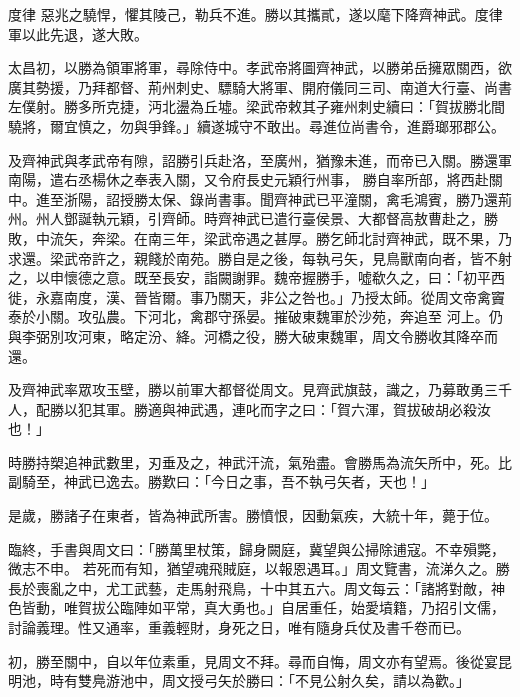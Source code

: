 \begin{pinyinscope}
 度律
 惡兆之驍悍，懼其陵己，勒兵不進。勝以其攜貳，遂以麾下降齊神武。度律軍以此先退，遂大敗。



 太昌初，以勝為領軍將軍，尋除侍中。孝武帝將圖齊神武，以勝弟岳擁眾關西，欲廣其勢援，乃拜都督、荊州刺史、驃騎大將軍、開府儀同三司、南道大行臺、尚書左僕射。勝多所克捷，沔北盪為丘墟。梁武帝敕其子雍州刺史續曰：「賀拔勝北間驍將，爾宜慎之，勿與爭鋒。」續遂城守不敢出。尋進位尚書令，進爵瑯邪郡公。



 及齊神武與孝武帝有隙，詔勝引兵赴洛，至廣州，猶豫未進，而帝已入關。勝還軍南陽，遣右丞楊休之奉表入關，又令府長史元穎行州事，
 勝自率所部，將西赴關中。進至浙陽，詔授勝太保、錄尚書事。聞齊神武已平潼關，禽毛鴻賓，勝乃還荊州。州人鄧誕執元穎，引齊師。時齊神武已遣行臺侯景、大都督高敖曹赴之，勝敗，中流矢，奔梁。在南三年，梁武帝遇之甚厚。勝乞師北討齊神武，既不果，乃求還。梁武帝許之，親餞於南苑。勝自是之後，每執弓矢，見鳥獸南向者，皆不射之，以申懷德之意。既至長安，詣闕謝罪。魏帝握勝手，噓欷久之，曰：「初平西徙，永嘉南度，漢、晉皆爾。事乃關天，非公之咎也。」乃授太師。從周文帝禽竇泰於小關。攻弘農。下河北，禽郡守孫晏。摧破東魏軍於沙苑，奔追至
 河上。仍與李弼別攻河東，略定汾、絳。河橋之役，勝大破東魏軍，周文令勝收其降卒而還。



 及齊神武率眾攻玉壁，勝以前軍大都督從周文。見齊武旗鼓，識之，乃募敢勇三千人，配勝以犯其軍。勝適與神武遇，連叱而字之曰：「賀六渾，賀拔破胡必殺汝也！」



 時勝持槊追神武數里，刃垂及之，神武汗流，氣殆盡。會勝馬為流矢所中，死。比副騎至，神武已逸去。勝歎曰：「今日之事，吾不執弓矢者，天也！」



 是歲，勝諸子在東者，皆為神武所害。勝憤恨，因動氣疾，大統十年，薨于位。



 臨終，手書與周文曰：「勝萬里杖策，歸身闕庭，冀望與公掃除逋寇。不幸殞斃，微志不申。
 若死而有知，猶望魂飛賊庭，以報恩遇耳。」周文覽書，流涕久之。勝長於喪亂之中，尤工武藝，走馬射飛鳥，十中其五六。周文每云：「諸將對敵，神色皆動，唯賀拔公臨陣如平常，真大勇也。」自居重任，始愛墳籍，乃招引文儒，討論義理。性又通率，重義輕財，身死之日，唯有隨身兵仗及書千卷而已。



 初，勝至關中，自以年位素重，見周文不拜。尋而自悔，周文亦有望焉。後從宴昆明池，時有雙鳧游池中，周文授弓矢於勝曰：「不見公射久矣，請以為歡。」




\end{pinyinscope}
